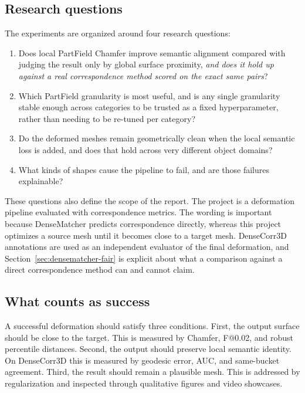 \documentclass{article}
\makeatletter
\newcommand{\Fscore}{F@0.02}
\makeatother
\begin{document}
\subsection{Research questions}

The experiments are organized around four research questions:

\begin{enumerate}
  \item Does local PartField Chamfer improve semantic alignment compared with judging the result
  only by global surface proximity, \emph{and does it hold up against a real correspondence method
  scored on the exact same pairs}?
  \item Which PartField granularity is most useful, and is any single granularity stable enough
  across categories to be trusted as a fixed hyperparameter, rather than needing to be re-tuned
  per category?
  \item Do the deformed meshes remain geometrically clean when the local semantic loss is added,
  and does that hold across very different object domains?
  \item What kinds of shapes cause the pipeline to fail, and are those failures explainable?
\end{enumerate}

These questions also define the scope of the report. The project is a deformation pipeline evaluated with
correspondence metrics. The wording is important because DenseMatcher predicts correspondence
directly, whereas this project optimizes a source mesh until it becomes close to a target mesh.
DenseCorr3D annotations are used as an independent evaluator of the final deformation, and
Section~\ref{sec:densematcher-fair} is explicit about what a comparison against a direct
correspondence method can and cannot claim.

\subsection{What counts as success}

A successful deformation should satisfy three conditions. First, the output surface should be
close to the target. This is measured by Chamfer, \Fscore{}, and robust percentile distances.
Second, the output should preserve local semantic identity. On DenseCorr3D this is measured by
geodesic error, AUC, and same-bucket agreement. Third, the result should remain a plausible mesh.
This is addressed by regularization and inspected through qualitative figures and video showcases.
\end{document}
